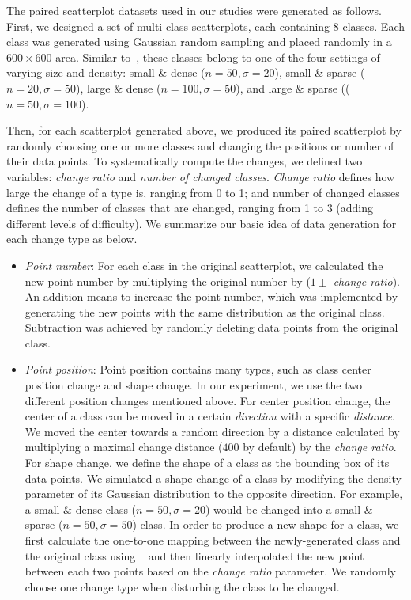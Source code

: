 \vspace{.3em}
The paired scatterplot datasets used in our studies were generated as follows.
First, we designed a set of multi-class scatterplots, each containing $8$ classes. Each class was generated using Gaussian random sampling and placed randomly in a $600 \times 600$ area.
Similar to~\cite{Lu21}, these classes belong to one of the four settings of varying size and density: small \& dense ($n=50, \sigma=20$), small \& sparse ($n=20, \sigma=50$),  large \& dense ($n=100, \sigma=50$), and large \& sparse (($n=50, \sigma=100$).

Then, for each scatterplot generated above, we produced its paired scatterplot by randomly choosing one or more classes and changing the positions or number of their data points.
To systematically compute the changes, we defined two variables: \emph{change ratio} and \emph{number of changed classes}.
\emph{Change ratio} defines how large the change of a type is, ranging from 0 to 1; and {number of changed classes} defines the number of classes that are changed, ranging from 1 to 3 (adding
different levels of difficulty). We summarize our basic idea of data generation for each change type as below.
\begin{itemize}

     \item \emph{Point number}: For each class in the original scatterplot,  we calculated the new point number by multiplying the original number by ($1 \pm$ \emph{change ratio}). An addition means to increase the point number, which was implemented by generating the new points with the same distribution as the original class. Subtraction was achieved by randomly deleting data points from the original class.

     \item \emph{Point position}: Point position contains many types, such as class center position change and shape change. In our experiment, we use the two different position changes mentioned above. For center position change, the center of a class can be moved in a certain \emph{direction} with a specific \emph{distance}. We moved the center towards a random direction by a distance calculated by multiplying a maximal change distance ($400$ by default) by the \emph{change ratio}. For shape change, we define the shape of a class as the bounding box of its data points. We simulated a shape change of a class by modifying the density parameter of its Gaussian distribution to the opposite direction. For example, a small \& dense class ($n=50, \sigma=20$) would be changed into a small \& sparse ($n=50, \sigma=50$) class. In order to produce a new shape for a class, we first calculate the one-to-one mapping between the newly-generated class and the original class using ~\cite{kuhn1955hungarian} and then linearly interpolated the new point between each two points based on the \emph{change ratio} parameter. We randomly choose one change type when disturbing the class to be changed.
\end{itemize}
